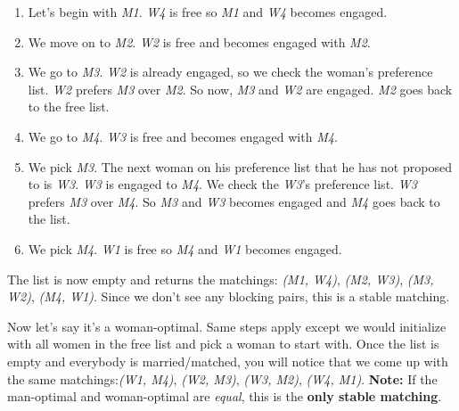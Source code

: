\documentclass[twoside]{article}
\begin{document}
\begin{enumerate}
\item Let's begin with \textit{M1}. \textit{W4} is free so \textit{M1} and \textit{W4} becomes engaged. 
\item We move on to \textit{M2}. \textit{W2} is free and becomes engaged with \textit{M2}.
\item We go to \textit{M3}. \textit{W2} is already engaged, so we check the woman's preference list. \textit{W2} prefers \textit{M3} over \textit{M2}. So now, \textit{M3} and \textit{W2} are engaged. \textit{M2} goes back to the free list.
\item We go to \textit{M4}. \textit{W3} is free and becomes engaged with \textit{M4}.
\item We pick \textit{M3}. The next woman on his preference list that he has not proposed to is \textit{W3}. \textit{W3} is engaged to \textit{M4}. We check the \textit{W3}'s preference list. \textit{W3} prefers \textit{M3} over \textit{M4}. So \textit{M3} and \textit{W3} becomes engaged and \textit{M4} goes back to the list.
\item We pick \textit{M4}. \textit{W1} is free so \textit{M4} and \textit{W1} becomes engaged.
\end{enumerate}
The list is now empty and returns the matchings: \textit{(M1, W4)}, \textit{(M2, W3)}, \textit{(M3, W2)}, \textit{(M4, W1)}. Since we don't see any blocking pairs, this is a stable matching.

Now let's say it's a woman-optimal. Same steps apply except we would initialize with all women in the free list and pick a woman to start with. Once the list is empty and everybody is married/matched, you will notice that we come up with the same matchings:\textit{(W1, M4)}, \textit{(W2, M3)}, \textit{(W3, M2)}, \textit{(W4, M1)}.\newline \newline
\textbf{Note:} If the man-optimal and woman-optimal are \textit{equal}, this is the \textbf{only stable matching}.
\end{document}
